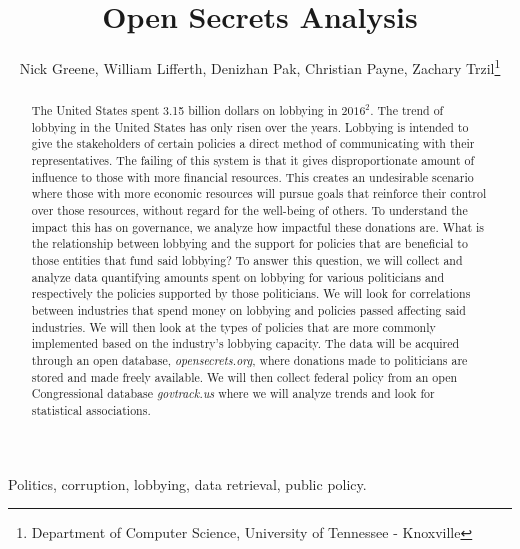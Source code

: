 \documentclass[journal]{IEEEtran}
\begin{document}
\title{Open Secrets Analysis}

\author{Nick Greene, William Lifferth, Denizhan Pak, Christian Payne, Zachary Trzil\thanks{Department of Computer Science, University of Tennessee - Knoxville}} \maketitle


\begin{abstract}
  The United States spent 3.15 billion dollars on lobbying in $2016^2$. The trend of lobbying in the United States 
  has only risen over the years. Lobbying is intended to give the stakeholders of certain policies a direct method 
  of communicating with their representatives. The failing of this system is that it gives disproportionate amount 
  of influence to those with more financial resources. This creates an undesirable scenario where those with more 
  economic resources will pursue goals that reinforce their control over those resources, without regard for the 
  well-being of others. To understand the impact this has on governance, we analyze how impactful these donations 
  are. What is the relationship between lobbying and the support for policies that are beneficial to those entities 
  that fund said lobbying? To answer this question, we will collect and analyze data quantifying amounts spent on 
  lobbying for various politicians and respectively the policies supported by those politicians. We will look for 
  correlations between industries that spend money on lobbying and policies passed affecting said industries. We 
  will then look at the types of policies that are more commonly implemented based on the industry's lobbying 
  capacity. The data will be acquired through an open database, \textit{opensecrets.org}, where donations made to 
  politicians are stored and made freely available. We will then collect federal policy from an open Congressional 
  database \textit{govtrack.us} where we will analyze trends and look for statistical associations.
\end{abstract}

\begin{IEEEkeywords}
Politics, corruption, lobbying, data retrieval, public policy.
\end{IEEEkeywords}
\end{document}
